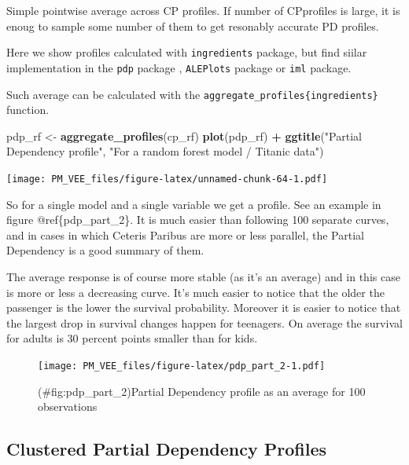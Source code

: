 \documentclass[12pt,]{krantz}
\newenvironment{Shaded}{\begin{snugshade}}{\end{snugshade}}
\newcommand{\KeywordTok}[1]{\textcolor[rgb]{0.13,0.29,0.53}{\textbf{#1}}}
\newcommand{\NormalTok}[1]{#1}
\newcommand{\OperatorTok}[1]{\textcolor[rgb]{0.81,0.36,0.00}{\textbf{#1}}}
\newcommand{\StringTok}[1]{\textcolor[rgb]{0.31,0.60,0.02}{#1}}
\theoremstyle{definition}
\theoremstyle{definition}
\theoremstyle{definition}
\theoremstyle{remark}
\begin{document}
Simple pointwise average across CP profiles. If number of CPprofiles is
large, it is enoug to sample some number of them to get resonably
accurate PD profiles.

Here we show profiles calculated with \texttt{ingredients} package, but
find siilar implementation in the \texttt{pdp} package \citep{pdp},
\texttt{ALEPlots} package \citep{R-ALEPlot} or \texttt{iml} \citep{iml}
package.

Such average can be calculated with the
\texttt{aggregate\_profiles\{ingredients\}} function.

\begin{Shaded}
\begin{Highlighting}[]
\NormalTok{pdp_rf <-}\StringTok{ }\KeywordTok{aggregate_profiles}\NormalTok{(cp_rf)}
\KeywordTok{plot}\NormalTok{(pdp_rf) }\OperatorTok{+}
\StringTok{  }\KeywordTok{ggtitle}\NormalTok{(}\StringTok{"Partial Dependency profile"}\NormalTok{, }\StringTok{"For a random forest model / Titanic data"}\NormalTok{) }
\end{Highlighting}
\end{Shaded}

\texttt{[image: PM\_VEE\_files/figure-latex/unnamed-chunk-64-1.pdf]}

So for a single model and a single variable we get a profile. See an
example in figure @ref\{pdp\_part\_2\}. It is much easier than following
100 separate curves, and in cases in which Ceteris Paribus are more or
less parallel, the Partial Dependency is a good summary of them.

The average response is of course more stable (as it's an average) and
in this case is more or less a decreasing curve. It's much easier to
notice that the older the passenger is the lower the survival
probability. Moreover it is easier to notice that the largest drop in
survival changes happen for teenagers. On average the survival for
adults is 30 percent points smaller than for kids.

\begin{figure}
\centering
\texttt{[image: PM\_VEE\_files/figure-latex/pdp\_part\_2-1.pdf]}
\caption{(\#fig:pdp\_part\_2)Partial Dependency profile as an average
for 100 observations}
\end{figure}

\hypertarget{clustered-partial-dependency-profiles}{%
\subsection{Clustered Partial Dependency
Profiles}\label{clustered-partial-dependency-profiles}}
\end{document}
